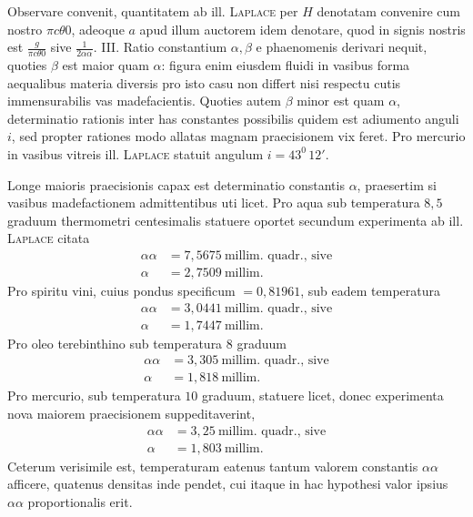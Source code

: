 \expandafter\def\csname HistoricalNoteText7\endcsname{Observare convenit, quantitatem ab ill. \textsc{Laplace} per $H$ denotatam convenire cum nostro $\pi c\theta0$, adeoque $a$ apud illum auctorem idem denotare, quod in signis nostris est $\frac{g}{\pi c\theta0}$ sive $\frac1{2\alpha\alpha}$.}%
III. Ratio constantium $\alpha,\beta$ e phaenomenis derivari nequit, quoties $\beta$ est maior quam $\alpha$: figura enim eiusdem fluidi in vasibus forma aequalibus materia diversis pro isto casu non differt nisi respectu cutis immensurabilis vas madefacientis. Quoties autem $\beta$ minor est quam $\alpha$, determinatio rationis inter has constantes possibilis quidem est adiumento anguli $i$, sed propter rationes modo allatas magnam praecisionem vix feret. Pro mercurio in vasibus vitreis ill. \textsc{Laplace} statuit angulum $i=43^0\,12'$.

Longe maioris praecisionis capax est determinatio constantis $\alpha$, praesertim si vasibus madefactionem admittentibus uti licet. Pro aqua sub temperatura $8{,}5$ graduum thermometri centesimalis statuere oportet secundum experimenta ab ill. \textsc{Laplace} citata
\[
\begin{aligned}
\alpha\alpha&=7{,}5675\ \text{millim. quadr., sive}\\
\alpha&=2{,}7509\ \text{millim.}
\end{aligned}
\]
Pro spiritu vini, cuius pondus specificum $=0{,}81961$, sub eadem temperatura
\[
\begin{aligned}
\alpha\alpha&=3{,}0441\ \text{millim. quadr., sive}\\
\alpha&=1{,}7447\ \text{millim.}
\end{aligned}
\]
Pro oleo terebinthino sub temperatura $8$ graduum
\[
\begin{aligned}
\alpha\alpha&=3{,}305\ \text{millim. quadr., sive}\\
\alpha&=1{,}818\ \text{millim.}
\end{aligned}
\]
Pro mercurio, sub temperatura $10$ graduum, statuere licet, donec experimenta nova maiorem praecisionem suppeditaverint,
\[
\begin{aligned}
\alpha\alpha&=3{,}25\ \text{millim. quadr., sive}\\
\alpha&=1{,}803\ \text{millim.}
\end{aligned}
\]
Ceterum verisimile est, temperaturam eatenus tantum valorem constantis $\alpha\alpha$ afficere, quatenus densitas inde pendet, cui itaque in hac hypothesi valor ipsius $\alpha\alpha$ proportionalis erit.

